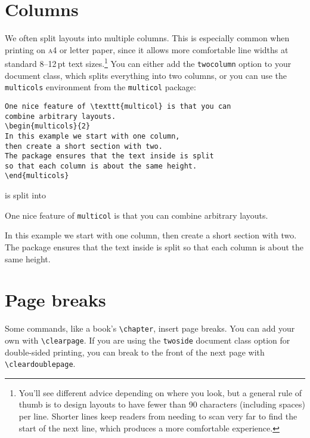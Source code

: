 \section{Columns}

We often split layouts into multiple columns.
This is especially common when printing on \textsc{a4} or  letter
paper, since it allows more comfortable line widths at standard
8--12\,pt text sizes.\punckern\footnote{You'll see different advice depending
on where you look, but a general rule of thumb is to design layouts to have
fewer than 90 characters (including spaces) per line.
Shorter lines keep readers from needing to scan very far to find the start of
the next line,
which produces a more comfortable experience.}
You can either add the \texttt{twocolumn} option to your document class,
which splits everything into two columns, or you can use the \texttt{multicols}
environment from the \texttt{multicol} package:
\begin{leftfigure}
\begin{lstlisting}
One nice feature of \texttt{multicol} is that you can
combine arbitrary layouts.
\begin{multicols}{2}
In this example we start with one column,
then create a short section with two.
The package ensures that the text inside is split
so that each column is about the same height.
\end{multicols}
\end{lstlisting}
\end{leftfigure}
is split into
\begin{leftfigure}
\lm%
One nice feature of \texttt{multicol} is that you can
combine arbitrary layouts.
\begin{multicols}{2}
In this example we start with one column,
then create a short section with two.
The package ensures that the text inside is split
so that each column is about the same height.
\end{multicols}
\end{leftfigure}

\section{Page breaks}

Some commands, like a book's \verb|\chapter|, insert page breaks.
You can add your own with \verb|\clearpage|.
If you are using the \texttt{twoside} document class option for double-sided
printing, you can break to the front of the next page with
\verb|\cleardoublepage|.

